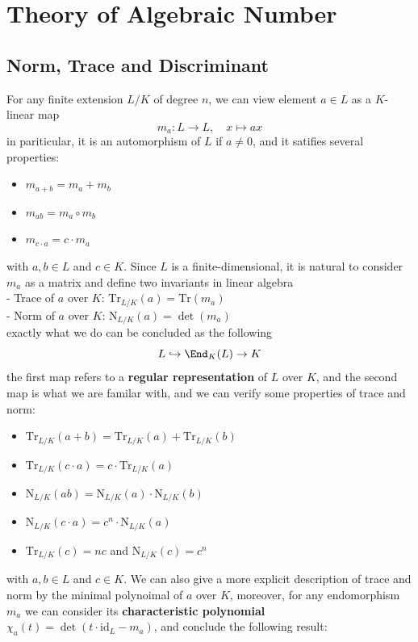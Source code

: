 \section{Theory of Algebraic Number}
\subsection{Norm, Trace and Discriminant}

For any finite extension \(L/K\) of degree \(n\), we can view element \(a \in L\) as a \(K\)-linear map
\[m_a: L \to L, \quad x \mapsto ax\]
in pariticular, it is an automorphism of \(L\) if \(a \neq 0\), and it satifies several properties:
\begin{itemize}
  \item \(m_{a+b} = m_a + m_b\)
  \item \(m_{ab} = m_a \circ m_b\)
  \item \(m_{c\cdot a} = c\cdot m_a\)
\end{itemize}
with \(a,b \in L\) and \(c \in K\). Since \(L\) is a finite-dimensional, it is natural to consider \(m_a\) as a matrix and define two invariants in linear algebra\\

- Trace of \(a\) over \(K\): \(\mathrm{Tr}_{L/K}(a) = \mathrm{Tr}(m_a)\)\\

- Norm of \(a\) over \(K\): \(\mathrm{N}_{L/K}(a) = \det(m_a)\)\\

exactly what we do can be concluded as the following
\[L \hookrightarrow \End_K(L) \to K\]
the first map refers to a \textbf{regular representation} of \(L\) over \(K\), and the second map is what we are familar with, and we can verify some properties of trace and norm:
\begin{itemize}
  \item \(\mathrm{Tr}_{L/K}(a+b) = \mathrm{Tr}_{L/K}(a) + \mathrm{Tr}_{L/K}(b)\)
  \item \(\mathrm{Tr}_{L/K}(c\cdot a) = c\cdot \mathrm{Tr}_{L/K}(a)\)
  \item \(\mathrm{N}_{L/K}(ab) = \mathrm{N}_{L/K}(a)\cdot\mathrm{N}_{L/K}(b)\)
  \item \(\mathrm{N}_{L/K}(c\cdot a) = c^n \cdot \mathrm{N}_{L/K}(a)\)
  \item \(\mathrm{Tr}_{L/K}(c) = nc\) and \(\mathrm{N}_{L/K}(c) = c^n\)
\end{itemize}
with \(a,b \in L\) and \(c \in K\). We can also give a more explicit description of trace and norm by the minimal polynoimal of \(a\) over \(K\), moreover, for any endomorphism \(m_a\) we can consider its \textbf{characteristic polynomial} \(\chi_a(t) = \det(t\cdot \mathrm{id}_L - m_a)\), and conclude the following result:

